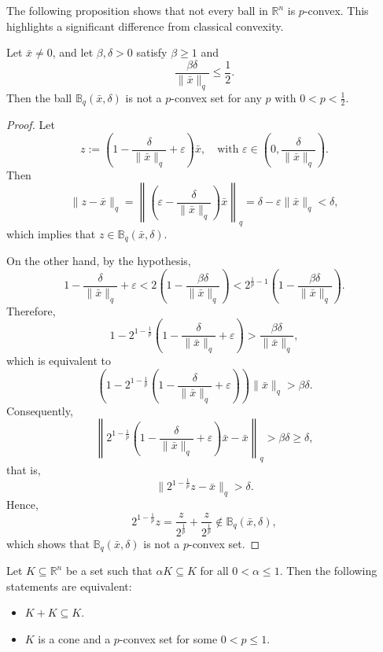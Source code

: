 \documentclass[10pt]{article}
\begin{document}
The following proposition shows that not every ball in $\mathbb{R}^{n}$ is $p$-convex. This highlights a significant difference from classical convexity.
\begin{proposition}
Let $\bar{x} \neq 0$, and let $\beta, \delta > 0$ satisfy $\beta \geq 1$ and 
\[
\frac{\beta \delta}{\|\bar{x}\|_{q}} \leq \frac{1}{2}.
\]
Then the ball $\mathbb{B}_{q}(\bar{x}, \delta)$ is not a $p$-convex set for any $p$ with $0 < p < \frac{1}{2}$.
\label{ejemplo no p convexa}
\end{proposition}
\begin{proof}
Let 
\[
z := \left(1 - \frac{\delta}{\|\bar{x}\|_{q}} + \varepsilon \right)\bar{x},
\quad \text{with } \varepsilon \in \left(0, \frac{\delta}{\|\bar{x}\|_{q}}\right).
\]
Then
\[
\|z - \bar{x}\|_{q}
= \left\|\left(\varepsilon - \frac{\delta}{\|\bar{x}\|_{q}}\right)\bar{x}\right\|_{q}
= \delta - \varepsilon \|\bar{x}\|_{q}
< \delta,
\]
which implies that $z \in \mathbb{B}_{q}(\bar{x}, \delta)$.

On the other hand, by the hypothesis,
\[
1 - \frac{\delta}{\|\bar{x}\|_{q}} + \varepsilon
< 2\left(1 - \frac{\beta \delta}{\|\bar{x}\|_{q}}\right)
< 2^{\frac{1}{p}-1}\left(1 - \frac{\beta \delta}{\|\bar{x}\|_{q}}\right).
\]
Therefore,
\[
1 - 2^{1-\frac{1}{p}}\left(1 - \frac{\delta}{\|\bar{x}\|_{q}} + \varepsilon\right)
> \frac{\beta \delta}{\|\bar{x}\|_{q}},
\]
which is equivalent to
\[
\left(1 - 2^{1-\frac{1}{p}}\left(1 - \frac{\delta}{\|\bar{x}\|_{q}} + \varepsilon\right)\right)\|\bar{x}\|_{q}
> \beta \delta.
\]
Consequently,
\[
\left\|2^{1-\frac{1}{p}}\left(1 - \frac{\delta}{\|\bar{x}\|_{q}} + \varepsilon\right)\bar{x} - \bar{x}\right\|_{q}
> \beta \delta
\geq \delta,
\]
that is,
\[
\|2^{1-\frac{1}{p}} z - \bar{x}\|_{q} > \delta.
\]
Hence,
\[
2^{1-\frac{1}{p}} z
= \frac{z}{2^{\frac{1}{p}}} + \frac{z}{2^{\frac{1}{p}}}
\notin \mathbb{B}_{q}(\bar{x}, \delta),
\]
which shows that $\mathbb{B}_{q}(\bar{x}, \delta)$ is not a $p$-convex set.
\end{proof}



\begin{proposition}
Let $K \subseteq \mathbb{R}^{n}$ be a set such that $\alpha K \subseteq K$ for all $0 < \alpha \leq 1$.  
Then the following statements are equivalent:
\begin{itemize}
\item[(a)] $K + K \subseteq K$.
\item[(b)] $K$ is a cone and a $p$-convex set for some $0 < p \leq 1$.
\end{itemize}
\label{cono convexo}
\end{proposition}
\end{document}
